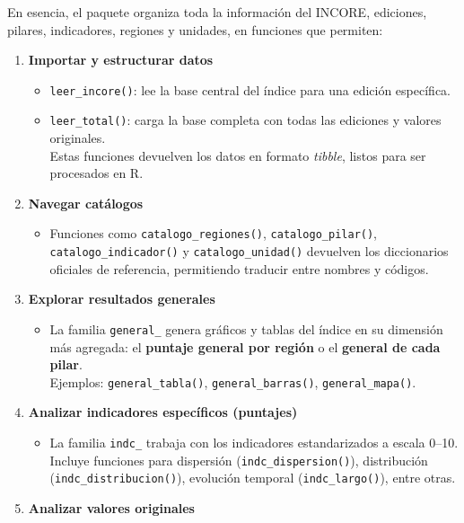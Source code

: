 \documentclass[
  11pt,
  letterpaper,
  DIV=11,
  numbers=noendperiod]{scrartcl}
\providecommand{\tightlist}{%
  \setlength{\itemsep}{0pt}\setlength{\parskip}{0pt}}\usepackage{longtable,booktabs,array}
\begin{document}
En esencia, el paquete organiza toda la información del INCORE,
ediciones, pilares, indicadores, regiones y unidades, en funciones que
permiten:

\begin{enumerate}
\def\labelenumi{\arabic{enumi}.}
\tightlist
\item
  \textbf{Importar y estructurar datos}

  \begin{itemize}
  \tightlist
  \item
    \texttt{leer\_incore()}: lee la base central del índice para una
    edición específica.\\
  \item
    \texttt{leer\_total()}: carga la base completa con todas las
    ediciones y valores originales.\\
    Estas funciones devuelven los datos en formato \emph{tibble}, listos
    para ser procesados en R.
  \end{itemize}
\item
  \textbf{Navegar catálogos}

  \begin{itemize}
  \tightlist
  \item
    Funciones como \texttt{catalogo\_regiones()},
    \texttt{catalogo\_pilar()}, \texttt{catalogo\_indicador()} y
    \texttt{catalogo\_unidad()} devuelven los diccionarios oficiales de
    referencia, permitiendo traducir entre nombres y códigos.
  \end{itemize}
\item
  \textbf{Explorar resultados generales}

  \begin{itemize}
  \tightlist
  \item
    La familia \texttt{general\_} genera gráficos y tablas del índice en
    su dimensión más agregada: el \textbf{puntaje general por región} o
    el \textbf{general de cada pilar}.\\
    Ejemplos: \texttt{general\_tabla()}, \texttt{general\_barras()},
    \texttt{general\_mapa()}.
  \end{itemize}
\item
  \textbf{Analizar indicadores específicos (puntajes)}

  \begin{itemize}
  \tightlist
  \item
    La familia \texttt{indc\_} trabaja con los indicadores
    estandarizados a escala 0--10.\\
    Incluye funciones para dispersión (\texttt{indc\_dispersion()}),
    distribución (\texttt{indc\_distribucion()}), evolución temporal
    (\texttt{indc\_largo()}), entre otras.
  \end{itemize}
\item
  \textbf{Analizar valores originales}


\end{enumerate}
\end{document}
